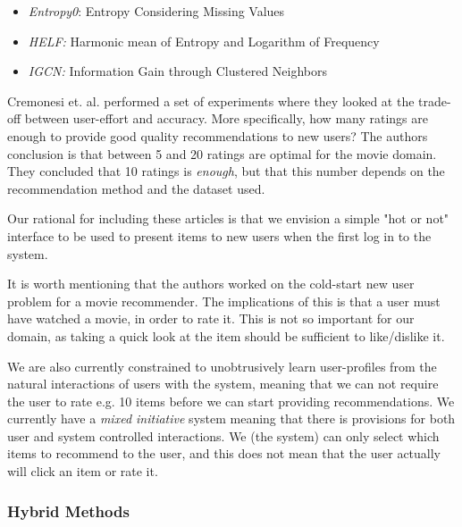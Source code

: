 \begin{itemize}
\item \emph{Entropy0}: Entropy Considering Missing Values
\item \emph{HELF:} Harmonic mean of Entropy and Logarithm of Frequency
\item \emph{IGCN:} Information Gain through Clustered Neighbors
\end{itemize}


Cremonesi et. al. \cite{Cremonesi2012} performed a set of experiments where
they looked at the trade-off between user-effort and accuracy. More
specifically, how many ratings are enough to provide good quality
recommendations to new users? The authors conclusion is that between 5 and 20
ratings are optimal for the movie domain. They concluded that 10
ratings is \emph{enough}, but that this number depends on the recommendation method
and the dataset used.


Our rational for including these articles is that we envision a simple "hot or not" interface to be used to present items to new users when the first log in to the system.


It is worth mentioning that the authors worked on the cold-start new user
problem for a movie recommender. The implications of this is that a user must
have watched a movie, in order to rate it. This is not so important for our
domain, as taking a quick look at the item should be sufficient to like/dislike
it. 


We are also currently constrained to unobtrusively learn user-profiles from the natural
interactions of users with the system, meaning that we can not require the user
to rate e.g. 10 items before we can start providing recommendations. We
currently have a \emph{mixed initiative} system meaning that there is
provisions for both user and system controlled interactions. We (the system)
can only select which items to recommend to the user, and this does not mean
that the user actually will click an item or rate it.


\subsubsection{Hybrid Methods}

